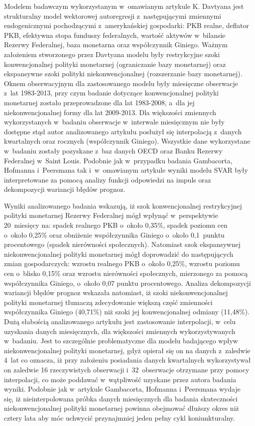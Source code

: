 Modelem badawczym wykorzystanym w~omawianym artykule K. Davtyana jest strukturalny model wektorowej autoregresji z~następującymi zmiennymi endogenicznymi pochodzącymi z~amerykańskiej gospodarki: \acs{PKB} realne, deflator \acs{PKB}, efektywna stopa funduszy federalnych, wartość aktywów w~bilansie Rezerwy Federalnej, baza monetarna oraz współczynnik Giniego. Ważnym założeniem stworzonego przez Davtyana modelu były restrykcyjne szoki konwencjonalnej polityki monetarnej (ograniczanie bazy monetarnej) oraz ekspansywne szoki polityki niekonwencjonalnej (rozszerzanie bazy monetarnej). Oknem obserwacyjnym dla zastosowanego modelu były miesięczne obserwacje z~lat 1983-2013, przy czym badanie dotyczące konwencjonalnej polityki monetarnej zostało przeprowadzone dla lat 1983-2008, a~dla jej niekonwencjonalnej formy dla lat 2009-2013. Dla większości zmiennych wykorzystanych w~badaniu obserwacje w~interwale miesięcznym nie były dostępne stąd autor analizowanego artykułu posłużył się interpolacją z~danych kwartalnych oraz rocznych (współczynnik Giniego). Wszystkie dane wykorzystane w~badaniu zostały pozyskane z~baz danych OECD oraz Banku Rezerwy Federalnej w~Saint Louis. Podobnie jak w~przypadku badania Gambacorta, Hofmanna i~Peersmana tak i~w~omawianym artykule wyniki modelu \acs{SVAR} były interpretowane za pomocą analizy funkcji odpowiedzi na impuls oraz dekompozycji wariancji błędów prognoz.

Wyniki analizowanego badania wskazują, iż szok konwencjonalnej restrykcyjnej polityki monetarnej Rezerwy Federalnej mógł wpłynąć w~perspektywie 20~miesięcy na: spadek realnego \acs{PKB} o~około 0,35\%, spadek poziomu cen o~około 0,25\% oraz obniżenie współczynnika Giniego o~około 0,1~punktu procentowego (spadek nierówności społecznych). Natomiast szok ekspansywnej niekonwencjonalnej polityki monetarnej mógł doprowadzić do następujących zmian gospodarczych: wzrostu realnego \acs{PKB} o~około 0,25\%, wzrostu poziomu cen o~blisko 0,15\% oraz wzrostu nierówności społecznych, mierzonego za pomocą współczynnika Giniego, o~około 0,07 punktu procentowego. Analiza dekompozycji wariancji błędów prognoz wskazała natomiast, iż szoki niekonwencjonalnej polityki monetarnej tłumaczą zdecydowanie większą część zmienności współczynnika Giniego (40,71\%) niż szoki jej konwencjonalnej odmiany (11,48\%). Dużą słabością analizowanego artykułu jest zastosowanie interpolacji, w~celu uzyskania danych miesięcznych, dla większości zmiennych wykorzystywanych w~badaniu. Jest to szczególnie problematyczne dla modelu badającego wpływ niekonwencjonalnej polityki monetarnej, gdyż opierał się on na danych z~zaledwie 4~lat co oznacza, iż przy założeniu posiadania danych kwartalnych wykorzystywał on zaledwie 16 rzeczywistych obserwacji i~32~obserwacje otrzymane przy pomocy interpolacji, co może poddawać w~wątpliwość uzyskane przez autora badania wyniki. Podobnie jak w~artykule Gambacorta, Hofmanna i~Peersmana wydaje się, iż nieinterpolowana próbka danych miesięcznych dla badania skuteczności niekonwencjonalnej polityki monetarnej powinna obejmować dłuższy okres niż cztery lata aby móc uchwycić przynajmniej jeden pełny cykl koniunkturalny.

